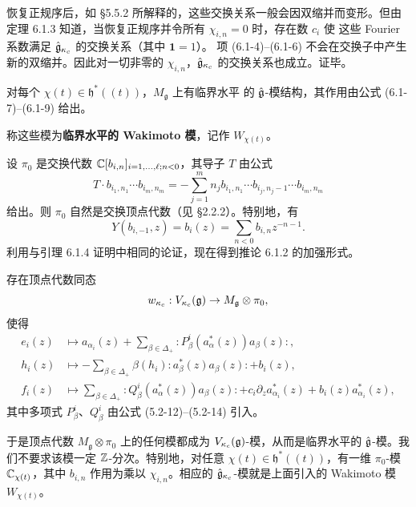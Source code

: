 恢复正规序后，如 \S5.5.2 所解释的，这些交换关系一般会因双缩并而变形。但由
定理 6.1.3 知道，当恢复正规序并令所有 $\chi_{i,n}=0$ 时，存在数 $c_i$ 使
这些 Fourier 系数满足 $\hat{\mathfrak{g}}_{\kappa_c}$ 的交换关系（其中 $\mathbf 1=1$）。
项 (6.1-4)--(6.1-6) 不会在交换子中产生新的双缩并。因此对一切非零的
$\chi_{i,n}$，$\hat{\mathfrak{g}}_{\kappa_c}$ 的交换关系也成立。证毕。

\renewcommand{\thecorollary}{6.1.5}
\begin{corollary}
    对每个 $\chi(t)\in\mathfrak h^*(\!(t)\!)$，$M_{\mathfrak g}$ 上有临界水平
    的 $\hat{\mathfrak{g}}$-模结构，其作用由公式 (6.1-7)--(6.1-9) 给出。
\end{corollary}

称这些模为\textbf{临界水平的 Wakimoto 模}，记作 $W_{\chi(t)}$。

设 $\pi_0$ 是交换代数 $\mathbb{C}[b_{i,n}]_{i=1,\dots,\ell;n<0}$，其导子 $T$ 由公式
\[
    T\cdot b_{i_1,n_1}\cdots b_{i_m,n_m}
    =-\sum_{j=1}^mn_jb_{i_1,n_1}\cdots b_{i_j,n_j-1}\cdots b_{i_m,n_m}
\]
给出。则 $\pi_0$ 自然是交换顶点代数（见 \S2.2.2）。特别地，有
\[
    Y(b_{i,-1},z)=b_i(z)=\sum_{n<0}b_{i,n}z^{-n-1}.
\]
利用与引理 6.1.4 证明中相同的论证，现在得到推论 6.1.2 的加强形式。

\renewcommand{\thetheorem}{6.1.6}
\begin{theorem}
    存在顶点代数同态
    \[
        w_{\kappa_c}:V_{\kappa_c}(\mathfrak{g})\to M_{\mathfrak g}\otimes\pi_0,
    \]
    使得
    \begin{equation}
        \begin{aligned}
            e_i(z)&\mapsto a_{\alpha_i}(z)+\sum_{\beta\in\Delta_+}
            :\!P^i_\beta(a^*_\alpha(z))a_\beta(z)\!:,\\
            h_i(z)&\mapsto-\sum_{\beta\in\Delta_+}
            \beta(h_i):\!a^*_\beta(z)a_\beta(z)\!:+b_i(z),\\
            f_i(z)&\mapsto\sum_{\beta\in\Delta_+}
            :\!Q^i_\beta(a^*_\alpha(z))a_\beta(z)\!:
            +c_i\partial_za^*_{\alpha_i}(z)+b_i(z)a^*_{\alpha_i}(z),
        \end{aligned}
        \tag{6.1-10}
    \end{equation}
    其中多项式 $P^i_\beta$、$Q^i_\beta$ 由公式 (5.2-12)--(5.2-14) 引入。
\end{theorem}

于是顶点代数 $M_{\mathfrak g}\otimes\pi_0$ 上的任何模都成为
$V_{\kappa_c}(\mathfrak{g})$-模，从而是临界水平的 $\hat{\mathfrak{g}}$-模。我们不要求该模一定
$\mathbb{Z}$-分次。特别地，对任意 $\chi(t)\in\mathfrak h^*(\!(t)\!)$，有一维
$\pi_0$-模 $\mathbb{C}_{\chi(t)}$，其中 $b_{i,n}$ 作用为乘以 $\chi_{i,n}$。相应的
$\hat{\mathfrak{g}}_{\kappa_c}$-模就是上面引入的 Wakimoto 模 $W_{\chi(t)}$。

